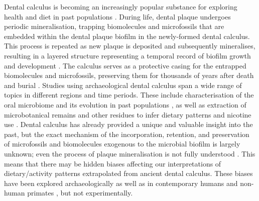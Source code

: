 \documentclass[10pt,a4paper]{article}
\begin{document}
Dental calculus is becoming an increasingly popular substance for
exploring health and diet in past populations
\citep{warinnerNewEra2015}. During life, dental plaque undergoes
periodic mineralisation, trapping biomolecules and microfossils that are
embedded within the dental plaque biofilm in the newly-formed dental
calculus. This process is repeated as new plaque is deposited and
subsequently mineralises, resulting in a layered structure representing
a temporal record of biofilm growth and development
\citep{warinnerPathogensHost2014}. The calculus serves as a protective
casing for the entrapped biomolecules and microfossils, preserving them
for thousands of years after death and burial
\citep{yatesOralMicrobiome2021}. Studies using archaeological dental
calculus span a wide range of topics in different regions and time
periods. These include characterisation of the oral microbiome and its
evolution in past populations
\citep{velskoMicrobialDifferences2019, adlerSequencingAncient2013, warinnerPathogensHost2014, kazarinaPostmedievalMicrobial2021, yatesOralMicrobiome2021},
as well as extraction of microbotanical remains
\citep{henryCalculusSyria2008, hardyStarchGranules2009, mickleburghNewInsights2012, maHumanDiet2022}
and other residues to infer dietary patterns and nicotine use
\citep{buckleyDentalCalculus2014, hendyProteomicCalculus2018, eerkensDentalCalculus2018, bartholdyMultiproxyAnalysis2023, velskoDentalCalculus2017}.
Dental calculus has already provided a unique and valuable insight into
the past, but the exact mechanism of the incorporation, retention, and
preservation of microfossils and biomolecules exogenous to the microbial
biofilm is largely unknown; even the process of plaque mineralisation is
not fully understood
\citep{omelonReviewPhosphate2013, jinSupragingivalCalculus2002}. This
means that there may be hidden biases affecting our interpretations of
dietary/activity patterns extrapolated from ancient dental calculus.
These biases have been explored archaeologically
\citep{fagernasMicrobialBiogeography2022, trompEDTACalculus2017} as well
as in contemporary humans \citep{leonardPlantMicroremains2015} and
non-human primates \citep{powerChimpCalculus2015}, but not
experimentally.
\end{document}
